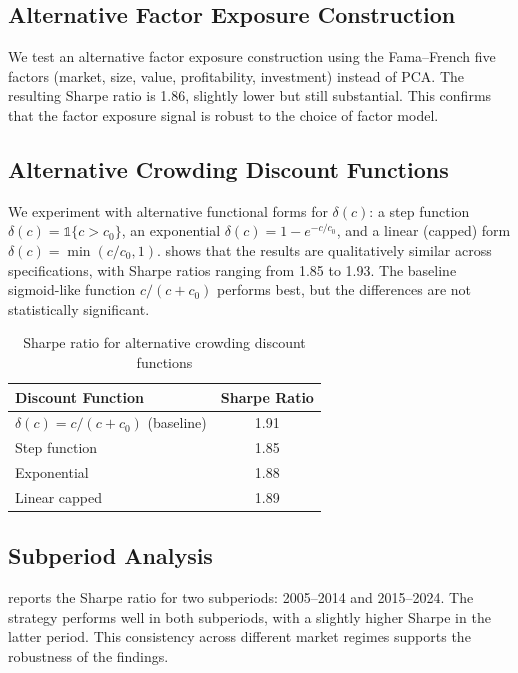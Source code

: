 \subsection{Alternative Factor Exposure Construction}

We test an alternative factor exposure construction using the Fama--French five
factors (market, size, value, profitability, investment) instead of PCA. The
resulting Sharpe ratio is 1.86, slightly lower but still substantial. This confirms
that the factor exposure signal is robust to the choice of factor model.

\subsection{Alternative Crowding Discount Functions}

We experiment with alternative functional forms for $\delta(c)$: a step function
$\delta(c) = \mathbb{1}\{c > c_0\}$, an exponential $\delta(c) = 1 -
e^{-c/c_0}$, and a linear (capped) form $\delta(c) = \min(c/c_0, 1)$.
 shows that the results are qualitatively similar
across specifications, with Sharpe ratios ranging from 1.85 to 1.93. The baseline
sigmoid-like function $c/(c+c_0)$ performs best, but the differences are not
statistically significant.

\begin{table}[ht]
\centering
\caption{Sharpe ratio for alternative crowding discount functions}
\label{tab:robustness-discount}
\begin{tabular}{lc}
\toprule
\textbf{Discount Function} & \textbf{Sharpe Ratio} \\
\midrule
$\delta(c) = c/(c+c_0)$ (baseline) & 1.91 \\
Step function & 1.85 \\
Exponential & 1.88 \\
Linear capped & 1.89 \\
\bottomrule
\end{tabular}
\end{table}

\subsection{Subperiod Analysis}

 reports the Sharpe ratio for two subperiods:
2005--2014 and 2015--2024. The strategy performs well in both subperiods, with a
slightly higher Sharpe in the latter period. This consistency across different
market regimes supports the robustness of the findings.

